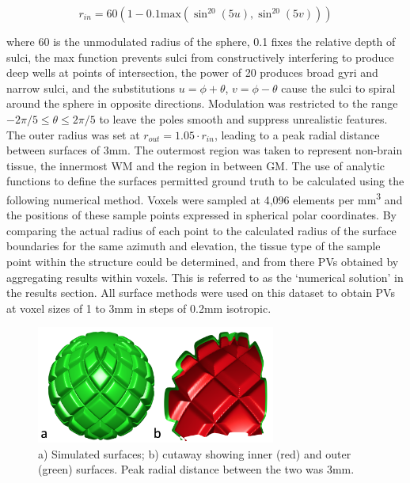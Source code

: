\documentclass[12pt]{report}
\begin{document}
\begin{equation}
r_{in} = 60 (1 - 0.1 \mathrm{max}(\sin^{20}(5u), \sin^{20}(5v) ) )
\end{equation}

where 60 is the unmodulated radius of the sphere, 0.1 fixes the relative depth of sulci, the max function prevents sulci from constructively interfering to produce deep wells at points of intersection, the power of 20 produces broad gyri and narrow sulci, and the substitutions $u= \phi + \theta$, $v= \phi - \theta$ cause the sulci to spiral around the sphere in opposite directions. Modulation was restricted to the range $-2\pi/5 \leq \theta \leq 2\pi/5$ to leave the poles smooth and suppress unrealistic features. The outer radius was set at $r_{out}= 1.05 \cdot r_{in}$, leading to a peak radial distance between surfaces of 3mm. The outermost region was taken to represent non-brain tissue, the innermost WM and the region in between GM. The use of analytic functions to define the surfaces permitted ground truth to be calculated using the following numerical method. Voxels were sampled at 4,096 elements per mm\textsuperscript{3} and the positions of these sample points expressed in spherical polar coordinates. By comparing the actual radius of each point to the calculated radius of the surface boundaries for the same azimuth and elevation, the tissue type of the sample point within the structure could be determined, and from there PVs obtained by aggregating results within voxels. This is referred to as the ‘numerical solution’ in the results section. All surface methods were used on this dataset to obtain PVs at voxel sizes of 1 to 3mm in steps of 0.2mm isotropic. 

\begin{figure}
\centering
\includegraphics[width = 0.7\textwidth]{simsurfs.png}
\caption{a) Simulated surfaces; b) cutaway showing inner (red) and outer (green) surfaces. Peak radial distance between the two was 3mm.}
\label{simsurfs}
\end{figure}
\end{document}
